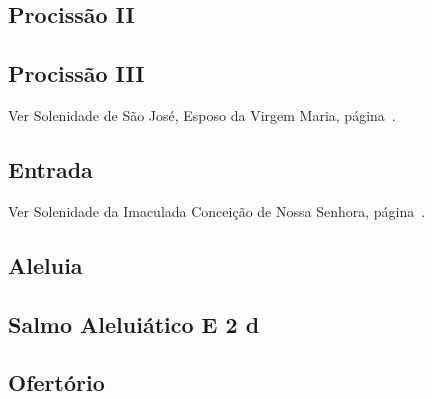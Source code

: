 \AllowPageFlush

\subsection{Procissão II}\label{subsection:proprium-sanctorum/in-praesentatione-domini/ad-processionem-2}

\subsection{Procissão III}
\begin{rubrica}
  Ver Solenidade de São José, Esposo da Virgem Maria, página~\pageref{subsection:proprium-sanctorum/sancti-ioseph-sponsi-bmv/psalmus-responsorius}.
\end{rubrica}

\AllowPageFlush

\subsection{Entrada}\label{subsection:proprium-sanctorum/in-praesentatione-domini/introitus}


\begin{rubrica}
  Ver Solenidade da Imaculada Conceição de Nossa Senhora, página~\pageref{subsection:proprium-sanctorum/in-conceptione-immaculata-bmv/psalmus-responsorius}.
\end{rubrica}

\subsection{Aleluia}\label{subsection:proprium-sanctorum/in-praesentatione-domini/alleluia}

\AllowPageFlush

\subsection[Salmo Aleluiático]{Salmo Aleluiático \textmd{E 2 d}}\label{subsection:proprium-sanctorum/in-praesentatione-domini/psalmus-alleluiaticus}

\AllowPageFlush

\subsection{Ofertório}\label{subsection:proprium-sanctorum/in-praesentatione-domini/offertorium}

